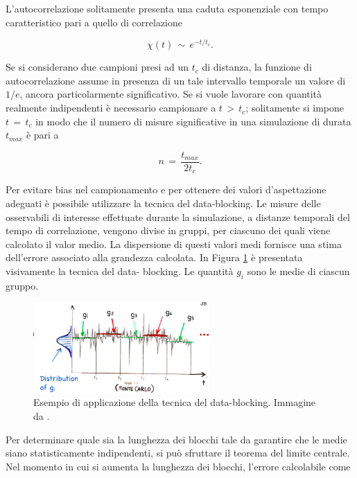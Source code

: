 L'autocorrelazione solitamente presenta una caduta esponenziale con tempo caratteristico pari a quello di correlazione

\begin{equation}
    \chi\left(t\right)\,\sim\,e^{-t/t_c}.
    \label{eq: auto_corr_cad_exp}
\end{equation}

Se si considerano due campioni presi ad un $t_c$ di distanza, la funzione di autocorrelazione assume in presenza di un tale 
intervallo temporale un valore di $1/e$, ancora particolarmente significativo. Se si vuole lavorare con quantità realmente indipendenti 
è necessario campionare a $t\,>\,t_c$; solitamente si impone $t\,=\,t_c$ in modo che il numero di misure significative in una 
simulazione di durata $t_{max}$ è pari a 

\begin{equation}
    n\,=\,\frac{t_{max}}{2 t_c}.
    \label{eq: num_ind_samp}
\end{equation}

Per evitare bias nel campionamento e per ottenere dei valori d'aspettazione adeguati è possibile utilizzare la tecnica del 
data-blocking. Le misure delle osservabili di interesse effettuate durante la simulazione, a distanze temporali del tempo di correlazione, 
vengono divise in gruppi, per ciascuno dei quali viene calcolato il valor medio. La dispersione di questi valori medi fornisce una 
stima dell'errore associato alla grandezza calcolata. In Figura \ref{fig: data_block_tech} è presentata visivamente la tecnica del data-
blocking. Le quantità $g_i$ sono le medie di ciascun gruppo.

\begin{figure}[H]
    \centering
    \includegraphics[width=0.6\textwidth]{Immagini/data_blocking.png}
    \caption{Esempio di applicazione della tecnica del data-blocking. Immagine da \cite{galliLSN}.}
    \label{fig: data_block_tech}
\end{figure}

Per determinare quale sia la lunghezza dei blocchi tale da garantire che le medie siano statisticamente indipendenti, si può 
sfruttare il teorema del limite centrale. Nel momento in cui si aumenta la lunghezza dei blocchi, l'errore calcolabile come 

